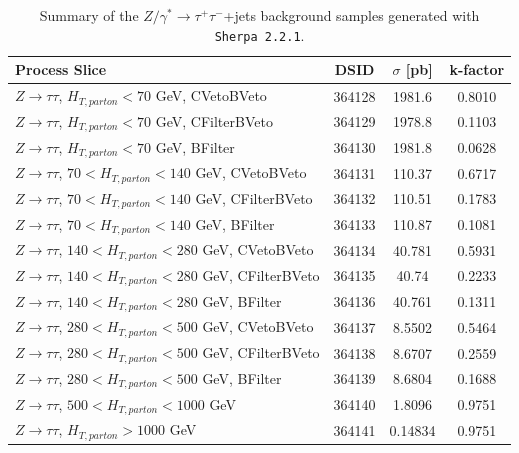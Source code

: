 \begin{table}[htbp]
\centering
\scriptsize
\begin{tabularx}{400pt}{|X||c|c|c|}
\hline
\centering \textbf{Process Slice} & \textbf{DSID} & \textbf{$\sigma$ [pb]} & \textbf{k-factor}\\
\hline
$Z\rightarrow \tau\tau$, $H_{T,parton} < 70$ GeV, CVetoBVeto & 364128 & 1981.6 & 0.8010 \\ \hline
$Z\rightarrow \tau\tau$, $H_{T,parton} < 70$ GeV, CFilterBVeto & 364129 & 1978.8 & 0.1103 \\ \hline
$Z\rightarrow \tau\tau$, $H_{T,parton} < 70$ GeV, BFilter & 364130 & 1981.8 & 0.0628 \\ \hline
$Z\rightarrow \tau\tau$, $70 < H_{T,parton} < 140$ GeV, CVetoBVeto & 364131 & 110.37 & 0.6717 \\ \hline
$Z\rightarrow \tau\tau$, $70 < H_{T,parton} < 140$ GeV, CFilterBVeto & 364132 & 110.51 & 0.1783 \\ \hline
$Z\rightarrow \tau\tau$, $70 < H_{T,parton} < 140$ GeV, BFilter & 364133 & 110.87 & 0.1081 \\ \hline
$Z\rightarrow \tau\tau$, $140 < H_{T,parton} < 280$ GeV, CVetoBVeto & 364134 & 40.781 & 0.5931 \\ \hline
$Z\rightarrow \tau\tau$, $140 < H_{T,parton} < 280$ GeV, CFilterBVeto & 364135 & 40.74 & 0.2233 \\ \hline
$Z\rightarrow \tau\tau$, $140 < H_{T,parton} < 280$ GeV, BFilter & 364136 & 40.761 & 0.1311 \\ \hline
$Z\rightarrow \tau\tau$, $280 < H_{T,parton} < 500$ GeV, CVetoBVeto & 364137 & 8.5502 & 0.5464 \\ \hline
$Z\rightarrow \tau\tau$, $280 < H_{T,parton} < 500$ GeV, CFilterBVeto & 364138 & 8.6707 & 0.2559 \\ \hline
$Z\rightarrow \tau\tau$, $280 < H_{T,parton} < 500$ GeV, BFilter & 364139 & 8.6804 & 0.1688 \\ \hline
$Z\rightarrow \tau\tau$, $500 < H_{T,parton} < 1000$ GeV & 364140 & 1.8096 & 0.9751 \\ \hline
$Z\rightarrow \tau\tau$, $H_{T,parton} > 1000$ GeV & 364141 & 0.14834 & 0.9751 \\ \hline
\end{tabularx}
\caption{\rm Summary of the $Z/\gamma^* \to \tau^+\tau^-$+jets background samples generated with \texttt{Sherpa~2.2.1}.}
\label{tab:ZjetsSamplesSherpa3}
\end{table}

